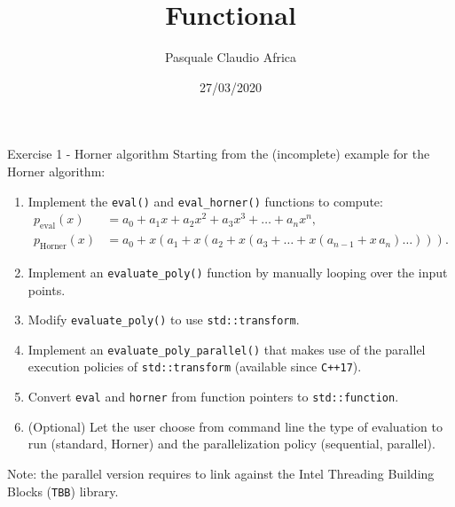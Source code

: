 \documentclass[10pt]{beamer}
\begin{document}
    \title{Functional}
    \author{Pasquale Claudio Africa}
    \date{27/03/2020}
    
\begin{frame}
    \maketitle
\end{frame}

\begin{frame}{Exercise 1 - Horner algorithm}
Starting from the (incomplete) example for the Horner algorithm:
\begin{enumerate}
\item Implement the \texttt{eval()} and \texttt{eval\_horner()} functions to compute:
\begin{align*}
p_\text{eval}(x) &= a_0 + a_1x + a_2x^2 + a_3x^3 + \ldots + a_nx^n, \\
p_\text{Horner}(x) &= a_0 + x \left(a_1 + x \left(a_2 + x \left(a_3 + \ldots + x\left(a_{n-1} + x \, a_n\right) \ldots \right) \right) \right).
\end{align*}
\item Implement an \texttt{evaluate\_poly()} function by manually looping over the input points.
\item Modify \texttt{evaluate\_poly()} to use \texttt{std::transform}.
\item Implement an \texttt{evaluate\_poly\_parallel()} that makes use of the parallel execution policies of \texttt{std::transform} (available since \texttt{C++17}).
\item Convert \texttt{eval} and \texttt{horner} from function pointers to \texttt{std::function}.
\item (Optional) Let the user choose from command line the type of evaluation to run (standard, Horner) and the parallelization policy (sequential, parallel).
\end{enumerate}

Note: the parallel version requires to link against the Intel Threading Building Blocks (\texttt{TBB}) library.
\end{frame}
\end{document}
